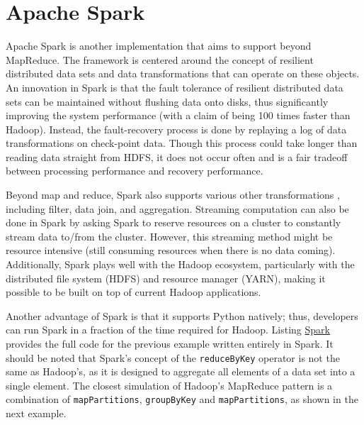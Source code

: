 \documentclass[]{krantz}
\begin{document}
\section{Apache Spark}\label{apache-spark}

Apache Spark is another implementation that aims to support beyond
MapReduce. The framework is centered around the concept of resilient
distributed data sets and data transformations that can operate on these
objects. An innovation in Spark is that the fault tolerance of resilient
distributed data sets can be maintained without flushing data onto
disks, thus significantly improving the system performance (with a claim
of being 100 times faster than Hadoop). Instead, the fault-recovery
process is done by replaying a log of data transformations on
check-point data. Though this process could take longer than reading
data straight from HDFS, it does not occur often and is a fair tradeoff
between processing performance and recovery performance.

Beyond map and reduce, Spark also supports various other transformations
\citep{SparkTransformation}, including filter, data join, and
aggregation. Streaming computation can also be done in Spark by asking
Spark to reserve resources on a cluster to constantly stream data
to/from the cluster. However, this streaming method might be resource
intensive (still consuming resources when there is no data coming).
Additionally, Spark plays well with the Hadoop ecosystem, particularly
with the distributed file system (HDFS) and resource manager (YARN),
making it possible to be built on top of current Hadoop applications.

Another advantage of Spark is that it supports Python natively; thus,
developers can run Spark in a fraction of the time required for Hadoop.
Listing \protect\hyperlink{list:parallel4}{Spark} provides the full code
for the previous example written entirely in Spark. It should be noted
that Spark's concept of the \texttt{reduceByKey} operator is not the
same as Hadoop's, as it is designed to aggregate all elements of a data
set into a single element. The closest simulation of Hadoop's MapReduce
pattern is a combination of \texttt{mapPartitions}, \texttt{groupByKey}
and \texttt{mapPartitions}, as shown in the next example.
\end{document}
